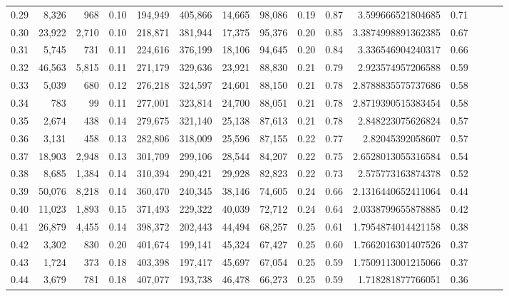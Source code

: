 \begin{tabular}{rrrrrrrrrrrrrrr}
0.29 &   8,326 &     968 &  0.10 &  194,949 &  405,866 &   14,665 &   98,086 &  0.19 &  0.87 &     3.599666521804685 &      0.71 \\
0.30 &  23,922 &   2,710 &  0.10 &  218,871 &  381,944 &   17,375 &   95,376 &  0.20 &  0.85 &    3.3874998891362385 &      0.67 \\
0.31 &   5,745 &     731 &  0.11 &  224,616 &  376,199 &   18,106 &   94,645 &  0.20 &  0.84 &     3.336546904240317 &      0.66 \\
0.32 &  46,563 &   5,815 &  0.11 &  271,179 &  329,636 &   23,921 &   88,830 &  0.21 &  0.79 &     2.923574957206588 &      0.59 \\
0.33 &   5,039 &     680 &  0.12 &  276,218 &  324,597 &   24,601 &   88,150 &  0.21 &  0.78 &    2.8788835575737686 &      0.58 \\
0.34 &     783 &      99 &  0.11 &  277,001 &  323,814 &   24,700 &   88,051 &  0.21 &  0.78 &    2.8719390515383454 &      0.58 \\
0.35 &   2,674 &     438 &  0.14 &  279,675 &  321,140 &   25,138 &   87,613 &  0.21 &  0.78 &     2.848223075626824 &      0.57 \\
0.36 &   3,131 &     458 &  0.13 &  282,806 &  318,009 &   25,596 &   87,155 &  0.22 &  0.77 &      2.82045392058607 &      0.57 \\
0.37 &  18,903 &   2,948 &  0.13 &  301,709 &  299,106 &   28,544 &   84,207 &  0.22 &  0.75 &    2.6528013055316584 &      0.54 \\
0.38 &   8,685 &   1,384 &  0.14 &  310,394 &  290,421 &   29,928 &   82,823 &  0.22 &  0.73 &     2.575773163874378 &      0.52 \\
0.39 &  50,076 &   8,218 &  0.14 &  360,470 &  240,345 &   38,146 &   74,605 &  0.24 &  0.66 &    2.1316440652411064 &      0.44 \\
0.40 &  11,023 &   1,893 &  0.15 &  371,493 &  229,322 &   40,039 &   72,712 &  0.24 &  0.64 &    2.0338799655878885 &      0.42 \\
0.41 &  26,879 &   4,455 &  0.14 &  398,372 &  202,443 &   44,494 &   68,257 &  0.25 &  0.61 &    1.7954874014421158 &      0.38 \\
0.42 &   3,302 &     830 &  0.20 &  401,674 &  199,141 &   45,324 &   67,427 &  0.25 &  0.60 &    1.7662016301407526 &      0.37 \\
0.43 &   1,724 &     373 &  0.18 &  403,398 &  197,417 &   45,697 &   67,054 &  0.25 &  0.59 &    1.7509113001215066 &      0.37 \\
0.44 &   3,679 &     781 &  0.18 &  407,077 &  193,738 &   46,478 &   66,273 &  0.25 &  0.59 &     1.718281877766051 &      0.36 \\

\end{tabular}
